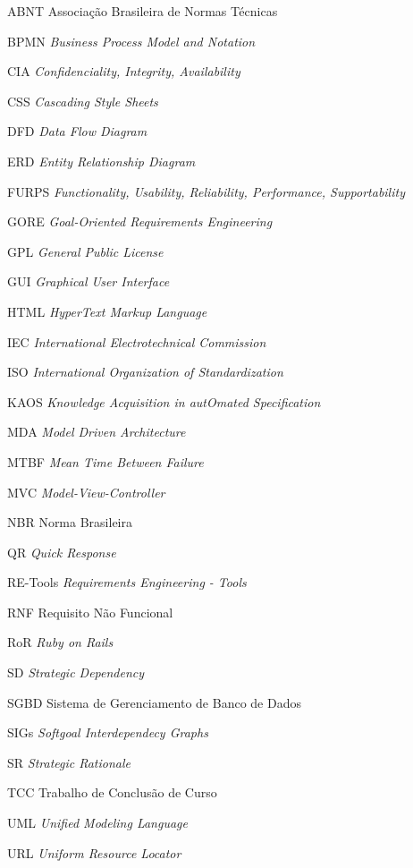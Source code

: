 \begin{siglas}
  \item[ABNT] Associação Brasileira de Normas Técnicas
  \item[BPMN] \textit{Business Process Model and Notation}
  \item[CIA] \textit{Confidenciality, Integrity, Availability}
  \item[CSS] \textit{Cascading Style Sheets}
  \item[DFD] \textit{Data Flow Diagram}
  \item[ERD] \textit{Entity Relationship Diagram}
  \item[FURPS] \textit{Functionality, Usability, Reliability, Performance, Supportability}
  \item[GORE] \textit{Goal-Oriented Requirements Engineering}
  \item[GPL] \textit{General Public License}
  \item[GUI] \textit{Graphical User Interface}
  \item[HTML] \textit{HyperText Markup Language}
  \item[IEC] \textit{International Electrotechnical Commission}
  \item[ISO] \textit{International Organization of Standardization}
  \item[KAOS] \textit{Knowledge Acquisition in autOmated Specification}
  \item[MDA] \textit{Model Driven Architecture}
  \item[MTBF] \textit{Mean Time Between Failure}
  \item[MVC] \textit{Model-View-Controller}
  \item[NBR] Norma Brasileira
  \item[QR] \textit{Quick Response}
  \item[RE-Tools] \textit{Requirements Engineering - Tools}
  \item[RNF] Requisito Não Funcional
  \item[RoR] \textit{Ruby on Rails}
  \item[SD] \textit{Strategic Dependency}
  \item[SGBD] Sistema de Gerenciamento de Banco de Dados
  \item[SIGs] \textit{Softgoal Interdependecy Graphs}
  \item[SR] \textit{Strategic Rationale}
  \item[TCC] Trabalho de Conclusão de Curso
  \item[UML] \textit{Unified Modeling Language}
  \item[URL] \textit{Uniform Resource Locator}
\end{siglas}
